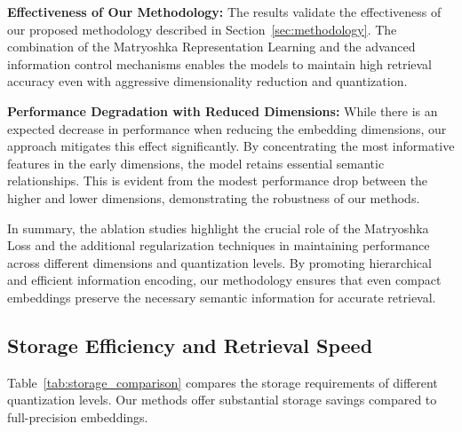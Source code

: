 \textbf{Effectiveness of Our Methodology:} The results validate the effectiveness of our proposed methodology described in Section~\ref{sec:methodology}. The combination of the Matryoshka Representation Learning and the advanced information control mechanisms enables the models to maintain high retrieval accuracy even with aggressive dimensionality reduction and quantization.

\textbf{Performance Degradation with Reduced Dimensions:} While there is an expected decrease in performance when reducing the embedding dimensions, our approach mitigates this effect significantly. By concentrating the most informative features in the early dimensions, the model retains essential semantic relationships. This is evident from the modest performance drop between the higher and lower dimensions, demonstrating the robustness of our methods.

In summary, the ablation studies highlight the crucial role of the Matryoshka Loss and the additional regularization techniques in maintaining performance across different dimensions and quantization levels. By promoting hierarchical and efficient information encoding, our methodology ensures that even compact embeddings preserve the necessary semantic information for accurate retrieval.

\subsection{Storage Efficiency and Retrieval Speed}

Table~\ref{tab:storage_comparison} compares the storage requirements of different quantization levels. Our methods offer substantial storage savings compared to full-precision embeddings.


\begin{table}[h]
    \centering
    \caption{Storage comparison for different embedding formats (768-dimensional vector)}
    \label{tab:storage_comparison}
\end{table}

